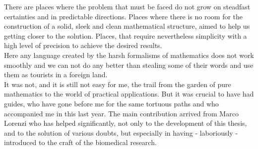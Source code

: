
There are places where the problem that must be faced do not grow on steadfast certainties and in predictable directions.
Places where there is no room for the construction of a solid, sleek and clean mathematical structure, aimed to help us getting closer to the solution.
Places, that require nevertheless simplicity with a high level of precision to achieve the desired results.\\
Here any language created by the harsh formalisms of mathematics does not work smoothly and we can not do any better than stealing some of their words and use them as tourists in a foreign land.\\

It was not, and it is still not easy for me, the trail from the garden of pure mathematics to the world of practical applications. But it was crucial to have had guides, who have gone before me for the same tortuous paths and who accompanied me in this last year. The main contribution arrived from Marco Lorenzi who has helped significantly, not only to the development of this thesis, and to the solution of various doubts, but especially in having - laboriously - introduced to the craft of the biomedical research.\\

